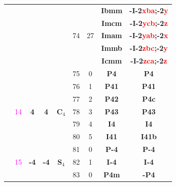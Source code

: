 \documentclass{article}      %
\begin{document}
\begin{small}
\begin{longtable}[c]{|c|c|c|c|c|c|c|c|c|}
          &  & & & &  & &\textbf{Ibmm}         &\textbf{-I-2\textcolor{red}{xba};-2\textcolor{red}{y}}\\\cline{8-9}       
          &  & & & &  & &\textbf{Imcm}         &\textbf{-I-2\textcolor{red}{ycb};-2\textcolor{red}{z}}\\\cline{8-9}       
	  &  & & & &\textrm{74}  &\textrm{27} &\textbf{Imam}         &\textbf{-I-2\textcolor{red}{yab};-2\textcolor{red}{x}}\\\cline{8-9}       
          &  & & & &  & &\textbf{Immb}         &\textbf{-I-2\textcolor{red}{zbc};-2\textcolor{red}{y}}\\\cline{8-9}     
          &  & & & &  & &\textbf{Icmm}         &\textbf{-I-2\textcolor{red}{zca};-2\textcolor{red}{z}}\\\hline       
          & & & & &\textrm{75} &\textrm{0} &\textbf{P4}         &\textbf{P4}\\\cline{6-9}              
          & & & & &\textrm{76} &\textrm{1} &\textbf{P41}         &\textbf{P41}\\\cline{6-9}            
          & & & & &\textrm{77} &\textrm{2} &\textbf{P42}         &\textbf{P4c}\\\cline{6-9}            
	  & \textrm{\textcolor{magenta}{14}} &\textbf{4} &\textbf{4} &$\mathbf{C}_4$ &\textrm{78} &\textrm{3} &\textbf{P43}         &\textbf{P43}\\\cline{6-9}            
          & & & & &\textrm{79} &\textrm{4} &\textbf{I4}         &\textbf{I4}\\\cline{6-9}              
          & & & & &\textrm{80} &\textrm{5} &\textbf{I41}         &\textbf{I41b}\\\cline{2-9}           
          & & & & &\textrm{81} &\textrm{0} &\textbf{P-4}         &\textbf{P-4}\\\cline{6-9}            
	  & \textrm{\textcolor{magenta}{15}} &\textbf{-4} &\textbf{-4} &$\mathbf{S}_4$ &\textrm{82} &\textrm{1} &\textbf{I-4}   &\textbf{I-4}\\\cline{2-9}  
          & & & & &\textrm{83} &\textrm{0} &\textbf{P4m}         &\textbf{-P4}\\\cline{6-9}            

\end{longtable}
\end{small}
\end{document}
